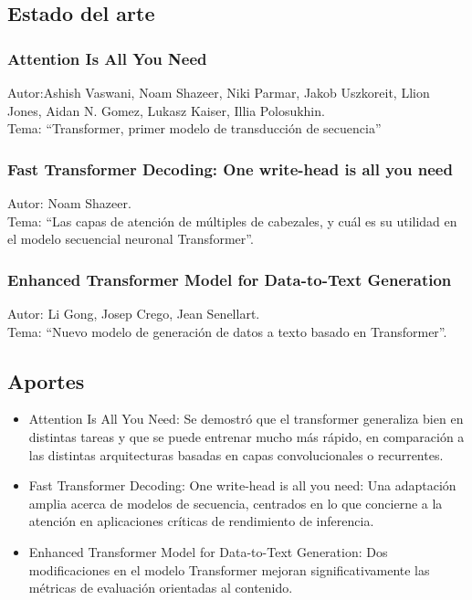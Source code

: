 \documentclass[10pt,twocolumn]{article}
\theoremstyle{definition}
\begin{document}
\subsection{Estado del arte}
\subsubsection{Attention Is All You Need}
Autor:Ashish Vaswani, Noam Shazeer, Niki Parmar, Jakob Uszkoreit, Llion Jones, Aidan N. Gomez, Lukasz Kaiser, Illia Polosukhin.\\ 
Tema: “Transformer, primer modelo de transducción de secuencia”
\subsubsection{Fast Transformer Decoding: One write-head is all you need}
Autor: Noam Shazeer. \\
Tema: “Las capas de atención de múltiples de cabezales, y cuál es su utilidad en el modelo secuencial neuronal Transformer”.
\subsubsection{Enhanced Transformer Model for Data-to-Text Generation}
Autor: Li Gong, Josep Crego, Jean Senellart. \\
Tema: “Nuevo modelo de generación de datos a texto basado en Transformer”.

\subsection{Aportes }
\begin{itemize}
    \item Attention Is All You Need\cite{b3}: Se demostró que el transformer generaliza bien en distintas tareas y que se puede entrenar mucho más rápido, en comparación a las distintas arquitecturas basadas en capas convolucionales o recurrentes.

    \item Fast Transformer Decoding: One write-head is all you need\cite{b4}: Una adaptación amplia acerca de modelos de secuencia, centrados en lo que concierne a la atención  en aplicaciones críticas de rendimiento de inferencia.

    \item Enhanced Transformer Model for Data-to-Text Generation\cite{b5}: Dos modificaciones en el modelo Transformer mejoran significativamente las métricas de evaluación orientadas al contenido.   

\end{itemize}
\end{document}
